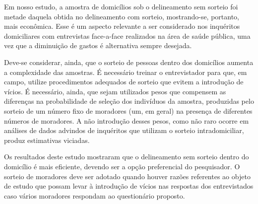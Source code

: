 \documentclass{article}
\begin{document}
Em nosso estudo, a amostra de domicílios sob o delineamento sem sorteio foi metade daquela obtida no delineamento com sorteio, mostrando-se, portanto, mais econômica. Esse é um aspecto relevante a ser considerado nos inquéritos domiciliares com entrevistas face-a-face realizados na área de saúde pública, uma vez que a diminuição de gastos é alternativa sempre desejada.

Deve-se considerar, ainda, que o sorteio de pessoas dentro dos domicílios aumenta a complexidade das amostras. É necessário treinar o entrevistador para que, em campo, utilize procedimentos adequados de sorteio que evitem a introdução de vícios. É necessário, ainda, que sejam utilizados pesos que compensem as diferenças na probabilidade de seleção dos indivíduos da amostra, produzidas pelo sorteio de um número fixo de moradores (um, em geral) na presença de diferentes números de moradores. A não introdução desses pesos, como não raro ocorre em análises de dados advindos de inquéritos que utilizam o sorteio intradomiciliar, produz estimativas viciadas.

Os resultados deste estudo mostraram que o delineamento sem sorteio dentro do domicílio é mais eficiente, devendo ser a opção preferencial do pesquisador. O sorteio de moradores deve ser adotado quando houver razões referentes ao objeto de estudo que possam levar à introdução de vícios nas respostas dos entrevistados caso vários moradores respondam ao questionário proposto.
\end{document}
